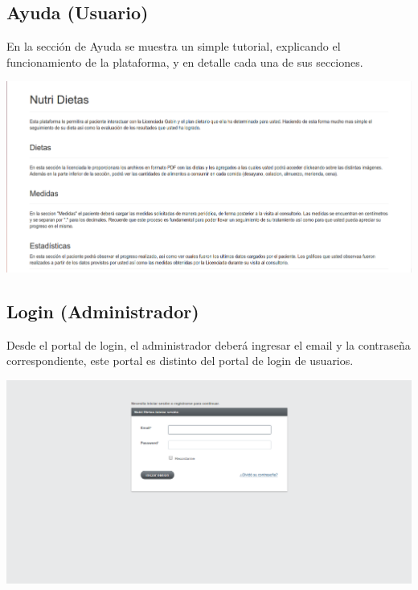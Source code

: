 \documentclass[runningheads,a4paper,spanish]{llncs}
\begin{document}
\subsection{Ayuda (Usuario)}
En la sección de Ayuda se muestra un simple tutorial, explicando el funcionamiento de la plataforma, y en detalle cada una de sus secciones.
\begin{center}
	\includegraphics[scale=0.3]{help.png}
\end{center}

\subsection{Login (Administrador)}
Desde el portal de login, el administrador deberá ingresar el email y la contraseña correspondiente, este portal es distinto del portal de login de usuarios.  
\begin{center}
	\includegraphics[scale=0.3]{admin_login.png}
\end{center}
\end{document}
